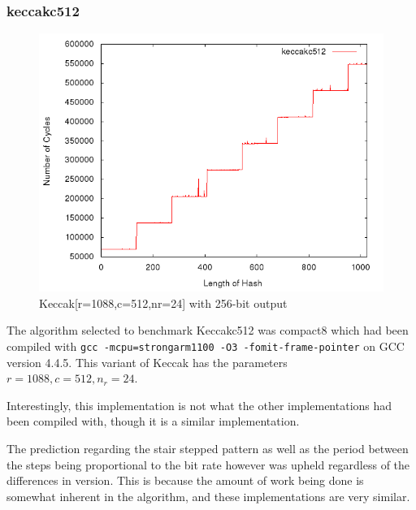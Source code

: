 \subsubsection{keccakc512}
\begin{figure}[H]
    \begin{center}
        \includegraphics[scale=0.5]{images/keccakc512.png} 
        \caption{Keccak[r=1088,c=512,nr=24] with 256-bit output}
    \end{center}
\end{figure}

The algorithm selected to benchmark Keccakc512 was compact8 which had been
compiled with \texttt{gcc -mcpu=strongarm1100 -O3 -fomit-frame-pointer} on GCC
version 4.4.5. This variant of Keccak has the parameters $r=1088,c=512,n_r=24$.

Interestingly, this implementation is not what the other implementations had
been compiled with, though it is a similar implementation.

The prediction regarding the stair stepped pattern as well as the period between
the steps being proportional to the bit rate however was upheld regardless of
the differences in version. This is because the amount of work being done is
somewhat inherent in the algorithm, and these implementations are very similar.


